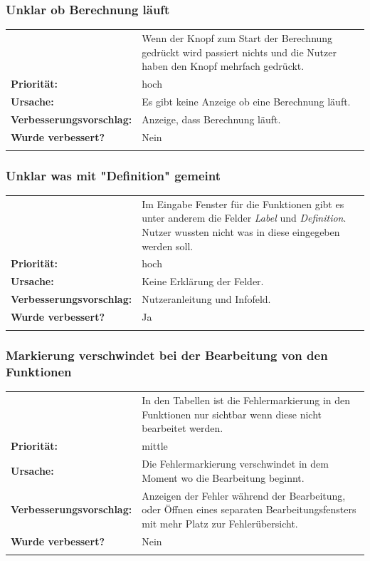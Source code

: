 \documentclass{article}
\begin{document}
\subsubsection*{Unklar ob Berechnung läuft}
\begin{tabular}{ll}
\begin{tabularx}{\textwidth}{rX}
    \textbf{Beschreibung:} & Wenn der Knopf zum Start der Berechnung gedrückt wird passiert nichts und die Nutzer haben den Knopf mehrfach gedrückt.\\
    \textbf{Priorität:} & hoch\\
    \textbf{Ursache:} & Es gibt keine Anzeige ob eine Berechnung läuft. \\
    \textbf{Verbesserungsvorschlag:} & Anzeige, dass Berechnung läuft.\\
    \textbf{Wurde verbessert?} & Nein\\
    \end{tabularx}
\end{tabular}

\subsubsection*{Unklar was mit "Definition" gemeint}
\begin{tabular}{ll}
\begin{tabularx}{\textwidth}{rX}
    \textbf{Beschreibung:} & Im Eingabe Fenster für die Funktionen gibt es unter anderem die Felder \emph{Label} und \emph{Definition}. Nutzer wussten nicht was in diese eingegeben werden soll.\\
    \textbf{Priorität:} & hoch\\
    \textbf{Ursache:} & Keine Erklärung der Felder. \\
    \textbf{Verbesserungsvorschlag:} & Nutzeranleitung und Infofeld.\\
    \textbf{Wurde verbessert?} & Ja\\
    \end{tabularx}
\end{tabular}

\subsubsection*{Markierung verschwindet bei der Bearbeitung von den Funktionen}
\begin{tabular}{ll}
\begin{tabularx}{\textwidth}{rX}
    \textbf{Beschreibung:} & In den Tabellen ist die Fehlermarkierung in den Funktionen nur sichtbar wenn diese nicht bearbeitet werden.\\
    \textbf{Priorität:} & mittle\\
    \textbf{Ursache:} & Die Fehlermarkierung verschwindet in dem Moment wo die Bearbeitung beginnt. \\
    \textbf{Verbesserungsvorschlag:} & Anzeigen der Fehler während der Bearbeitung, oder Öffnen eines separaten Bearbeitungsfensters mit mehr Platz zur Fehlerübersicht.\\
    \textbf{Wurde verbessert?} & Nein\\
    \end{tabularx}
\end{tabular}
\end{document}
